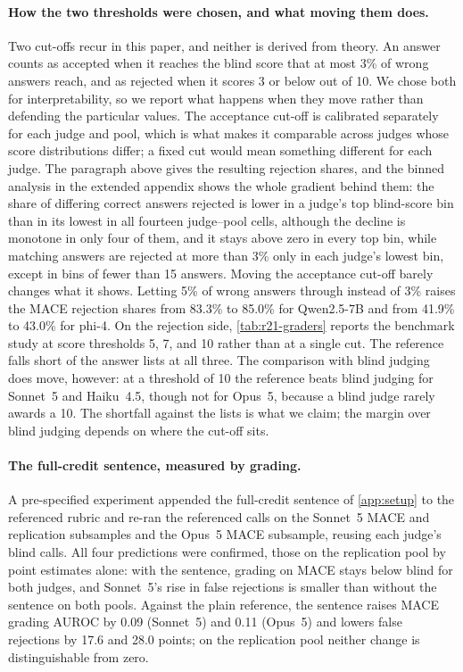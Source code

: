 \paragraph{How the two thresholds were chosen, and what moving them does.}
Two cut-offs recur in this paper, and neither is derived from theory. An answer counts as accepted when it reaches the blind score that at most 3\% of wrong answers reach, and as rejected when it scores 3 or below out of 10. We chose both for interpretability, so we report what happens when they move rather than defending the particular values. The acceptance cut-off is calibrated separately for each judge and pool, which is what makes it comparable across judges whose score distributions differ; a fixed cut would mean something different for each judge. The paragraph above gives the resulting rejection shares, and the binned analysis in the extended appendix shows the whole gradient behind them: the share of differing correct answers rejected is lower in a judge's top blind-score bin than in its lowest in all fourteen judge--pool cells, although the decline is monotone in only four of them, and it stays above zero in every top bin, while matching answers are rejected at more than 3\% only in each judge's lowest bin, except in bins of fewer than 15 answers. Moving the acceptance cut-off barely changes what it shows. Letting 5\% of wrong answers through instead of 3\% raises the \textsc{MACE} rejection shares from 83.3\% to 85.0\% for Qwen2.5-7B and from 41.9\% to 43.0\% for phi-4.\ph{} On the rejection side, \cref{tab:r21-graders} reports the benchmark study at score thresholds 5, 7, and 10 rather than at a single cut. The reference falls short of the answer lists at all three. The comparison with blind judging does move, however: at a threshold of 10 the reference beats blind judging for Sonnet~5 and Haiku~4.5, though not for Opus~5, because a blind judge rarely awards a 10. The shortfall against the lists is what we claim; the margin over blind judging depends on where the cut-off sits.

\paragraph{The full-credit sentence, measured by grading.}
A pre-specified experiment appended the full-credit sentence of \cref{app:setup} to the referenced rubric and re-ran the referenced calls on the Sonnet~5 \textsc{MACE} and replication subsamples and the Opus~5 \textsc{MACE} subsample, reusing each judge's blind calls. All four predictions were confirmed, those on the replication pool by point estimates alone: with the sentence, grading on \textsc{MACE} stays below blind for both judges, and Sonnet~5's rise in false rejections is smaller than without the sentence on both pools. Against the plain reference, the sentence raises \textsc{MACE} grading AUROC by 0.09 (Sonnet~5) and 0.11 (Opus~5) and lowers false rejections by 17.6 and 28.0 points; on the replication pool neither change is distinguishable from zero.\ph


